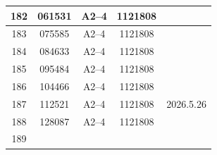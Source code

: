\documentclass[UTF8,10pt,a4paper,fontset=fandol]{ctexart}
\newcommand{\fieldvalue}[1]{#1}
\newcommand{\handwritten}[1]{#1}
\begin{document}
\begin{tabularx}{\textwidth}{|c|c|c|c|X|}
\fieldvalue{182} &
\fieldvalue{061531} &
\fieldvalue{A2--4} &
\fieldvalue{1121808} & \\ \hline
\fieldvalue{183} &
\fieldvalue{075585} &
\fieldvalue{A2--4} &
\fieldvalue{1121808} & \\ \hline
\fieldvalue{184} &
\fieldvalue{084633} &
\fieldvalue{A2--4} &
\fieldvalue{1121808} & \\ \hline
\fieldvalue{185} &
\fieldvalue{095484} &
\fieldvalue{A2--4} &
\fieldvalue{1121808} & \\ \hline
\fieldvalue{186} &
\fieldvalue{104466} &
\fieldvalue{A2--4} &
\fieldvalue{1121808} & \\ \hline
\fieldvalue{187} &
\fieldvalue{112521} &
\fieldvalue{A2--4} &
\fieldvalue{1121808} &
\handwritten{2026.5.26}
\\ \hline
\fieldvalue{188} &
\fieldvalue{128087} &
\fieldvalue{A2--4} &
\fieldvalue{1121808} & \\ \hline
\fieldvalue{189} &

\end{tabularx}
\end{document}
